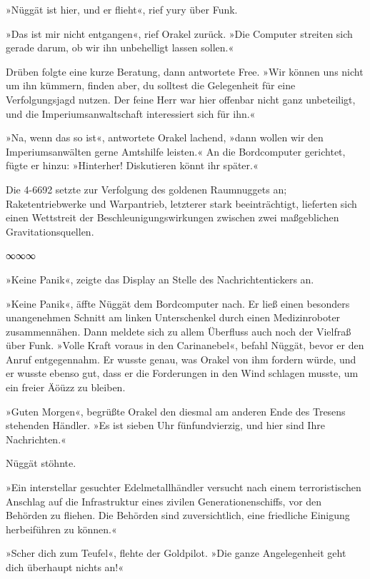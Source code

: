 »Nüggät ist hier, und er flieht«, rief yury über Funk.

»Das ist mir nicht entgangen«, rief Orakel zurück. »Die Computer streiten sich gerade darum, ob wir ihn unbehelligt lassen sollen.«

Drüben folgte eine kurze Beratung, dann antwortete Free. »Wir können uns nicht um ihn kümmern, finden aber, du solltest die Gelegenheit für eine Verfolgungsjagd nutzen. Der feine Herr war hier offenbar nicht ganz unbeteiligt, und die Imperiumsanwaltschaft interessiert sich für ihn.«

»Na, wenn das so ist«, antwortete Orakel lachend, »dann wollen wir den Imperiumsanwälten gerne Amtshilfe leisten.« An die Bordcomputer gerichtet, fügte er hinzu: »Hinterher! Diskutieren könnt ihr später.«

Die 4-6692 setzte zur Verfolgung des goldenen Raumnuggets an; Raketentriebwerke und Warpantrieb, letzterer stark beeinträchtigt, lieferten sich einen Wettstreit der Beschleunigungswirkungen zwischen zwei maßgeblichen Gravitationsquellen.

\begin{center}
	∞∞∞
\end{center}

»Keine Panik«, zeigte das Display an Stelle des Nachrichtentickers an.

»Keine Panik«, äffte Nüggät dem Bordcomputer nach. Er ließ einen besonders unangenehmen Schnitt am linken Unterschenkel durch einen Medizinroboter zusammennähen. Dann meldete sich zu allem Überfluss auch noch der Vielfraß über Funk. »Volle Kraft voraus in den Carinanebel«, befahl Nüggät, bevor er den Anruf entgegennahm. Er wusste genau, was Orakel von ihm fordern würde, und er wusste ebenso gut, dass er die Forderungen in den Wind schlagen musste, um ein freier Äöüzz zu bleiben.

»Guten Morgen«, begrüßte Orakel den diesmal am anderen Ende des Tresens stehenden Händler. »Es ist sieben Uhr fünfundvierzig, und hier sind Ihre Nachrichten.«

Nüggät stöhnte.

»Ein interstellar gesuchter Edelmetallhändler versucht nach einem terroristischen Anschlag auf die Infrastruktur eines zivilen Generationenschiffs, vor den Behörden zu fliehen. Die Behörden sind zuversichtlich, eine friedliche Einigung herbeiführen zu können.«

»Scher dich zum Teufel«, flehte der Goldpilot. »Die ganze Angelegenheit geht dich überhaupt nichts an!«

